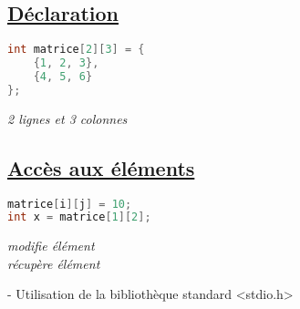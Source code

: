 \documentclass[a3paper,12pt]{article}
\begin{document}
\begin{minipage}[t]{0.5\textwidth}
\begin{tcolorbox}[title=Tableaux, fonttitle=\large, top=5pt, bottom=0pt, boxsep=1pt, colback=white,
  colframe=blue!40!black!50, 
  colbacktitle=blue!40!black!50,
  coltitle=white]
  \end{tcolorbox}
  \begin{tcolorbox}[title=Matrices, fonttitle=\large, top=5pt, bottom=0pt, boxsep=1pt, colback=white,
  colframe=blue!55!cyan, 
  colbacktitle=blue!55!cyan,
  coltitle=white,]
  \subsection*{{\small \underline{Déclaration}}}
  \vspace{-1.25em}
  \noindent
\begin{minipage}[t]{0.5\textwidth} 
  \begin{lstlisting}[language=C, basicstyle=\normalsize, aboveskip=0pt, belowskip=0pt]
int matrice[2][3] = {
    {1, 2, 3},
    {4, 5, 6}
};
  \end{lstlisting}
  \end{minipage}%
\hfill
\begin{minipage}[t]{0.45\textwidth}
\vspace{0.15em}
\textit{2 lignes et 3 colonnes}
\end{minipage}
  \vspace{-1em}
\subsection*{{\small \underline{Accès aux éléments}}}
\vspace{-1.25em}
\noindent
\begin{minipage}[t]{0.5\textwidth} 
\begin{lstlisting}[language=C, basicstyle=\normalsize, aboveskip=0pt, belowskip=0pt]
matrice[i][j] = 10;
int x = matrice[1][2];
\end{lstlisting}
\end{minipage}%
\hfill
\begin{minipage}[t]{0.45\textwidth}
\vspace{0.15em}
\textit{modifie élément}\\
 \textit{récupère élément}
\end{minipage}
  \end{tcolorbox}
  \begin{tcolorbox}[title=Manipulation de fichiers, fonttitle=\large, top=5.5pt, bottom=5pt, boxsep=1pt, colback=white,
  colframe=orange!50!black!40, 
  colbacktitle=orange!50!black!40,
  coltitle=white,]

  - Utilisation de la bibliothèque standard <stdio.h>
  \vspace{-1.25em}

\end{tcolorbox}
\end{minipage}
\end{document}

